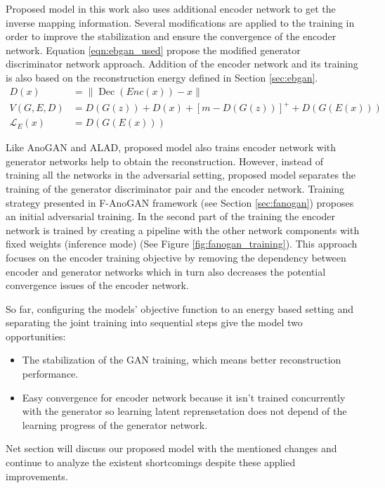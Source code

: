 Proposed model in this work also uses additional encoder network to get the inverse mapping
information. Several modifications are applied to the training in order to improve the stabilization
and ensure the convergence of the encoder network. Equation \ref{eqn:ebgan_used} propose the modified generator
discriminator network approach. Addition of the encoder network and its training is also based on the reconstruction 
energy defined in Section \ref{sec:ebgan}.
\begin{equation}
\label{eqn:encebgan_used}
\begin{aligned}
D(x)&=\|\operatorname{Dec}(E n c(x))-x\|\\[5pt]
V(G,E, D) &= D(G(z)) + D(x)+[m-D(G(z))]^{+} + D(G(E(x))) \\[5pt]
\mathcal{L}_{E}(x) &= D(G(E(x)))
\end{aligned}
\end{equation}

Like AnoGAN and ALAD, proposed model also trains encoder network with generator networks help to
obtain the reconstruction. However, instead of training all the networks in the adversarial setting,
proposed model separates the training of the generator discriminator pair and the encoder network.
Training strategy presented in F-AnoGAN framework (see Section \ref{sec:fanogan}) proposes an
initial adversarial training. In the second part of the training the encoder network is trained by
creating a pipeline with the other network components with fixed weights (inference mode) (See
Figure \ref{fig:fanogan_training}). This approach focuses on the encoder training objective by
removing the dependency between encoder and generator networks which in turn also decreases the potential
convergence issues of the encoder network.

So far, configuring the models' objective function to an energy based setting and separating the
joint training into sequential steps give the model two opportunities:

\begin{itemize}
	\item {The stabilization of the GAN training, which means better reconstruction performance.}
	\item {Easy convergence for encoder network because it isn't trained concurrently with the
	generator so learning latent reprensetation does not depend of the learning progress of the generator network. }
\end{itemize}

Net section will discuss our proposed model with the mentioned changes and continue to analyze the
existent shortcomings despite these applied improvements.


